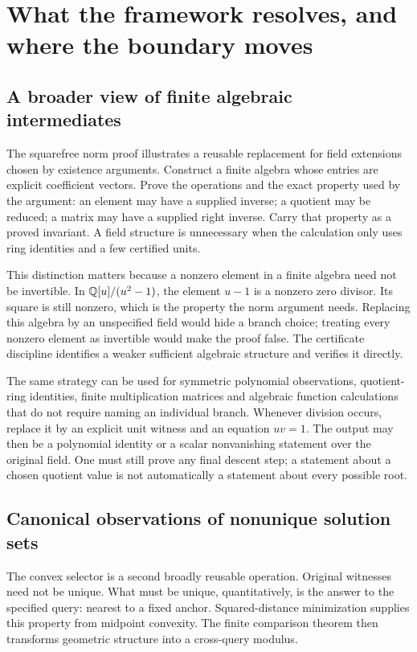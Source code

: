 \section{What the framework resolves, and where the boundary moves}
\label{sec:limits}

\subsection{A broader view of finite algebraic intermediates}

The squarefree norm proof illustrates a reusable replacement for field extensions chosen by existence arguments. Construct a finite algebra whose entries are explicit coefficient vectors. Prove the operations and the exact property used by the argument: an element may have a supplied inverse; a quotient may be reduced; a matrix may have a supplied right inverse. Carry that property as a proved invariant. A field structure is unnecessary when the calculation only uses ring identities and a few certified units.

This distinction matters because a nonzero element in a finite algebra need not be invertible. In $\mathbb Q[u]/(u^2-1)$, the element $u-1$ is a nonzero zero divisor. Its square is still nonzero, which is the property the norm argument needs. Replacing this algebra by an unspecified field would hide a branch choice; treating every nonzero element as invertible would make the proof false. The certificate discipline identifies a weaker sufficient algebraic structure and verifies it directly.

The same strategy can be used for symmetric polynomial observations, quotient-ring identities, finite multiplication matrices and algebraic function calculations that do not require naming an individual branch. Whenever division occurs, replace it by an explicit unit witness and an equation $uv=1$. The output may then be a polynomial identity or a scalar nonvanishing statement over the original field. One must still prove any final descent step; a statement about a chosen quotient value is not automatically a statement about every possible root.

\subsection{Canonical observations of nonunique solution sets}

The convex selector is a second broadly reusable operation. Original witnesses need not be unique. What must be unique, quantitatively, is the answer to the specified query: nearest to a fixed anchor. Squared-distance minimization supplies this property from midpoint convexity. The finite comparison theorem then transforms geometric structure into a cross-query modulus.

